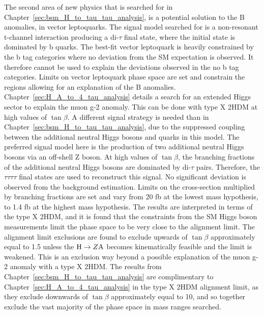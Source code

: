 The second area of new physics that is searched for in Chapter~\ref{sec:bsm_H_to_tau_tau_analysis}, is a potential solution to the B anomalies, in vector leptoquarks.
The signal model searched for is a non-resonant t-channel interaction producing a di-$\tau$ final state, where the initial state is dominated by b quarks.
The best-fit vector leptoquark is heavily constrained by the b tag categories where no deviation from the \ac{SM} expectation is observed.
It therefore cannot be used to explain the deviations observed in the no b tag categories.
Limits on vector leptoquark phase space are set and constrain the regions allowing for an explanation of the B anomalies. \\

Chapter~\ref{sec:H_A_to_4_tau_analysis} details a search for an extended Higgs sector to explain the muon g-2 anomaly.
This can be done with type X \ac{2HDM} at high values of $\tan\beta$.
A different signal strategy is needed than in Chapter~\ref{sec:bsm_H_to_tau_tau_analysis}, due to the suppressed coupling between the additional neutral Higgs bosons and quarks in this model.
The preferred signal model here is the production of two additional neutral Higgs bosons via an off-shell Z boson.
At high values of $\tan\beta$, the branching fractions of the additional neutral Higgs bosons are dominated by di-$\tau$ pairs.
Therefore, the $\tau\tau\tau\tau$ final states are used to reconstruct this signal.
No significant deviation is observed from the background estimation.
Limits on the cross-section multiplied by branching fractions are set and vary from 20 fb at the lowest mass hypothesis, to 1.4 fb at the highest mass hypothesis.
The results are interpreted in terms of the type X \ac{2HDM}, and it is found that the constraints from the \ac{SM} Higgs boson measurements limit the phase space to be very close to the alignment limit.
The alignment limit exclusions are found to exclude upwards of $\tan\beta$ approximately equal to 1.5 unless the ${\text{H}} \rightarrow Z{\text{A}}$ becomes kinematically feasible and the limit is weakened.
This is an exclusion way beyond a possible explanation of the muon g-2 anomaly with a type X \ac{2HDM}.
The results from Chapter~\ref{sec:bsm_H_to_tau_tau_analysis} are complimentary to Chapter~\ref{sec:H_A_to_4_tau_analysis} in the type X \ac{2HDM} alignment limit, as they exclude downwards of $\tan\beta$ approximately equal to 10, and so together exclude the vast majority of the phase space in mass ranges searched.

